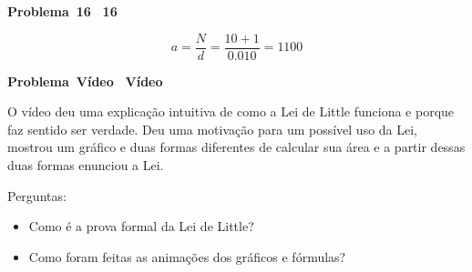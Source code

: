 \documentclass{article}
\newcounter{exe-list}
\newenvironment{exe}[2][]
    {\newcommand{\opt}{(Opcional)}%
    \newcommand{\sketch}[1]{{\bfseries Rascunho:} ##1}%
    \newcommand{\nop}{\hspace{-1ex}}%
    \medskip\par\noindent\ifthenelse{\equal{#1}{}}
        {\textbf{\large Problema~#2}}
        {\textbf{\large #1~#2}}%
    \medskip\par\noindent}
    {\medskip}
\begin{document}
\begin{exe}{16}
    \[
        a = \frac{N}{d} = \frac{10 + 1}{0.010} = 1100
    \]
\end{exe}

\begin{exe}[\nop]{Vídeo}
    O vídeo deu uma explicação intuitiva de como a
    Lei de Little funciona e porque faz sentido ser verdade.
    Deu uma motivação para um possível uso da Lei,
    mostrou um gráfico e duas formas diferentes
    de calcular sua área e a partir dessas duas formas
    enunciou a Lei.

    Perguntas:
    \begin{itemize}
        \item Como é a prova formal da Lei de Little?
        \item Como foram feitas as animações dos gráficos e fórmulas?
    \end{itemize}
\end{exe}
\end{document}
